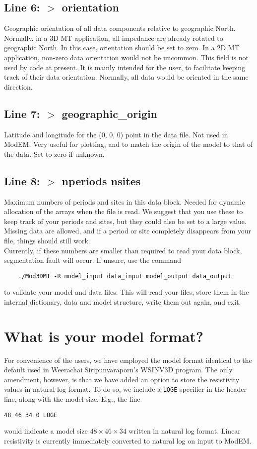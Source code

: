 \documentclass[12pt]{article}
\begin{document}
\subsection*{Line 6: $>$ orientation}
Geographic orientation of all data components relative to geographic North. Normally, in a 3D MT application, all impedance are already rotated to geographic North. In this case, orientation should be set to zero. In a 2D MT application, non-zero data orientation would not be uncommon. This field is not used by code at present. It is mainly intended for the user, to facilitate keeping track of their data orientation. Normally, all data would be oriented in the same direction.

\subsection*{Line 7: $>$ geographic\_origin}
Latitude and longitude for the (0, 0, 0) point in the data file. Not used in ModEM. Very useful for plotting, and to match the origin of the model to that of the data. Set to zero if unknown.

\subsection*{Line 8: $>$ nperiods nsites}
Maximum numbers of periods and sites in this data block. Needed for dynamic allocation of the arrays when the file is read. We suggest that you use these to keep track of your periods and sites, but they could also be set to a large value. Missing data are allowed, and if a period or site completely disappears from your file, things should still work.\\

Currently, if these numbers are smaller than required to read your data block, segmentation fault will occur. If unsure, use the command
\begin{verbatim}
    ./Mod3DMT -R model_input data_input model_output data_output
\end{verbatim}
to validate your model and data files. This will read your files, store them in the internal dictionary, data and model structure, write them out again, and exit.


\section{What is your model format?}

For convenience of the users, we have employed the model format identical to the default used in Weerachai Siripunvaraporn's WSINV3D program. The only amendment, however, is that we have added an option to store the resistivity values in natural log format. To do so, we include a \verb"LOGE" specifier in the header line, along with the model size. E.g., the line
\begin{verbatim}
48 46 34 0 LOGE
\end{verbatim}
would indicate a model size $48 \times 46 \times 34$ written in natural log format. Linear resistivity is currently immediately converted to natural log on input to ModEM.\\
\end{document}
